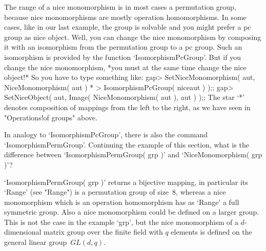 The range of  a nice monomorphism is in  most cases  a permutation group,
because  nice monomorphisms are   mostly operation homomorphisms. In some
cases, like in  our  last example,  the  group is solvable and  you might
prefer  a pc   group  as nice  object.  Well,  you  can change  the  nice
monomorphism by  composing  it with an   isomorphism from the permutation
group  to a pc group.   Such an isomorphism is   provided by the function
`IsomorphismPcGroup'. But if you change the  nice monomorphism, *you must
at the same time  change the nice object!*  So you have to type something
like:
\beginexample
    gap> SetNiceMonomorphism( aut, NiceMonomorphism( aut ) *
    >                              IsomorphismPcGroup( niceaut ) );;
    gap> SetNiceObject( aut, Image( NiceMonomorphism( aut ), aut ) );;
\endexample
The star `*' denotes composition of mappings from the  left to the right,
as we have seen in "Operations!of groups" above.

\exercise In  analogy to `IsomorphismPcGroup', there  is also the command
`IsomorphismPermGroup'. Continuing  the example of  this section, what is
the    difference   between      `IsomorphismPermGroup(   grp  )'     and
`NiceMonomorphism( grp )'?

\answer  `IsomorphismPermGroup(  grp )' returns  a  bijective mapping, in
particular its  `Range' (see "Range") is a  permutation  group of size~8,
whereas a   nice monomorphism which is an   operation homomorphism has as
`Range' a full symmetric group. Also a nice monomorphism could be defined
on  a larger group. This  is not the case in  the  example `grp', but the
nice monomorphism of a $d$-dimensional matrix group over the finite field
with $q$ elements is defined on the general linear group~$GL(d,q)$.

